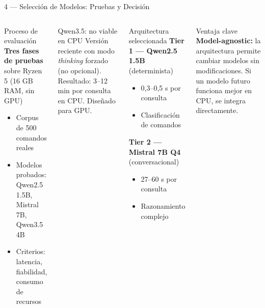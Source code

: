\begin{frame}{4 — Selección de Modelos: Pruebas y Decisión}
  \hypertarget{s:modelos}{}
  \begin{columns}[T]
    \begin{block}{Proceso de evaluación}
      \footnotesize
      \textbf{Tres fases de pruebas} sobre Ryzen 5 (16 GB RAM, sin GPU)
      \begin{itemize}
        \item Corpus de 500 comandos reales
        \item Modelos probados: Qwen2.5 1.5B, Mistral 7B, Qwen3.5 4B
        \item Criterios: latencia, fiabilidad, consumo de recursos
      \end{itemize}
    \end{block}

    \begin{alertblock}{Qwen3.5: no viable en CPU}
      \footnotesize
      Versión reciente con modo \textit{thinking} forzado (no opcional).
      Resultado: 3--12 min por consulta en CPU. Diseñado para GPU.
    \end{alertblock}

    \begin{exampleblock}{Arquitectura seleccionada}
      \footnotesize
      \textbf{Tier 1 — Qwen2.5 1.5B} (determinista)
      \begin{itemize}
        \item 0,3--0,5 s por consulta
        \item Clasificación de comandos
      \end{itemize}
      \textbf{Tier 2 — Mistral 7B Q4} (conversacional)
      \begin{itemize}
        \item 27--60 s por consulta
        \item Razonamiento complejo
      \end{itemize}
    \end{exampleblock}

    \begin{block}{Ventaja clave}
      \footnotesize
      \textbf{Model-agnostic:} la arquitectura permite cambiar
      modelos sin modificaciones. Si un modelo futuro funciona
      mejor en CPU, se integra directamente.
    \end{block}
  \end{columns}
\end{frame}

